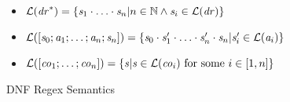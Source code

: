 \begin{figure}
\begin{itemize}
\item $\mathcal{L}{}(\mathit{dr}^*) =
\{\mathit{s}_1\cdot\ldots\cdot\mathit{s}_n | n\in\mathbb{N} \wedge \mathit{s}_i\in\mathcal{L}{}(\mathit{dr})\}$
\item $\mathcal{L}{}([\mathit{s}_0;\mathit{a}_1;\ldots;\mathit{a}_n;\mathit{s}_n])=
\{\mathit{s}_0\cdot\mathit{s}_1'\cdot\ldots\cdot\mathit{s}_n'\cdot\mathit{s}_n | \mathit{s}_i'\in\mathcal{L}{}(\mathit{a}_i)\}$
\item $\mathcal{L}{}([\mathit{co}_1;\ldots;\mathit{co}_n])=
\{\mathit{s} | \mathit{s} \in \mathcal{L}{}(\mathit{co}_i) \text{ for some $i\in[1,n]$}\}$
\end{itemize}
\caption{DNF Regex Semantics }
\label{fig:dnf-regex-semantics}
\end{figure}
